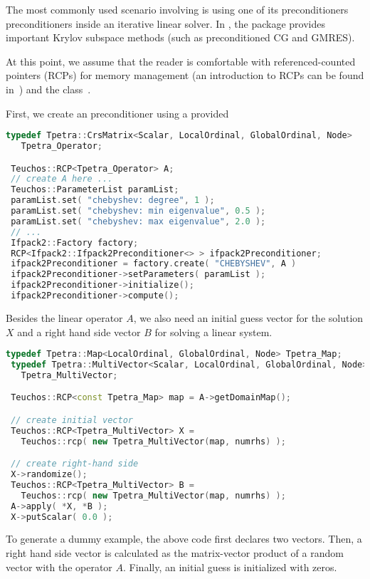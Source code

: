 The most commonly used scenario involving \ifpacktwo{} is using one of its
preconditioners preconditioners inside an iterative linear solver. In
\trilinos{}, the \belos{} package provides important Krylov subspace methods (such
as preconditioned CG and GMRES).

At this point, we assume that the reader is comfortable with \teuchos{} referenced-counted
pointers (RCPs) for memory management (an introduction to RCPs can be found
in~\cite{RCP2010}) and the \parameterlist class~\cite{TeuchosURL}.

First, we create an \ifpacktwo{} preconditioner using a provided \parameterlist
\begin{lstlisting}[language=C++]
 typedef Tpetra::CrsMatrix<Scalar, LocalOrdinal, GlobalOrdinal, Node>
   Tpetra_Operator;

 Teuchos::RCP<Tpetra_Operator> A;
 // create A here ...
 Teuchos::ParameterList paramList;
 paramList.set( "chebyshev: degree", 1 );
 paramList.set( "chebyshev: min eigenvalue", 0.5 );
 paramList.set( "chebyshev: max eigenvalue", 2.0 );
 // ...
 Ifpack2::Factory factory;
 RCP<Ifpack2::Ifpack2Preconditioner<> > ifpack2Preconditioner;
 ifpack2Preconditioner = factory.create( "CHEBYSHEV", A )
 ifpack2Preconditioner->setParameters( paramList );
 ifpack2Preconditioner->initialize();
 ifpack2Preconditioner->compute();
\end{lstlisting}

Besides the linear operator $A$, we also need an initial guess vector for the
solution $X$ and a right hand side vector $B$ for solving a linear system.
\begin{lstlisting}[language=C++]
 typedef Tpetra::Map<LocalOrdinal, GlobalOrdinal, Node> Tpetra_Map;
 typedef Tpetra::MultiVector<Scalar, LocalOrdinal, GlobalOrdinal, Node>
   Tpetra_MultiVector;

 Teuchos::RCP<const Tpetra_Map> map = A->getDomainMap();

 // create initial vector
 Teuchos::RCP<Tpetra_MultiVector> X =
   Teuchos::rcp( new Tpetra_MultiVector(map, numrhs) );

 // create right-hand side
 X->randomize();
 Teuchos::RCP<Tpetra_MultiVector> B =
   Teuchos::rcp( new Tpetra_MultiVector(map, numrhs) );
 A->apply( *X, *B );
 X->putScalar( 0.0 );
\end{lstlisting}
To generate a dummy example, the above code first declares two vectors. Then, a
right hand side vector is calculated as the matrix-vector product of a random vector
with the operator $A$. Finally, an initial guess is initialized with zeros.

